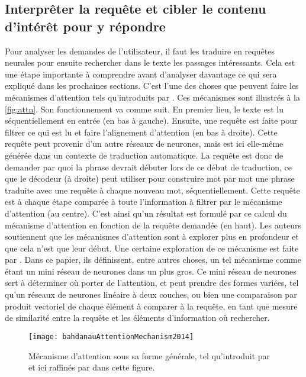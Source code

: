 \subsection{Interprêter la requête et cibler le contenu d'intérêt pour y répondre}

Pour analyser les demandes de l'utilisateur, il faut les traduire en requêtes neurales pour ensuite rechercher dans le texte les passages intéressants. Cela est une étape importante à comprendre avant d'analyser davantage ce qui sera expliqué dans les prochaines sections. C'est l'une des choses que peuvent faire les mécanismes d'attention tels qu'introduits par \cite{attentionMechanism}. Ces mécanismes sont illustrés à la \autoref{fig:attn}. Son fonctionnement va comme suit. En premier lieu, le texte est lu séquentiellement en entrée (en bas à gauche). Ensuite, une requête est faite pour filtrer ce qui est lu et faire l'alignement d'attention (en bas à droite). Cette requête peut provenir d'un autre réseaux de neurones, mais est ici elle-même générée dans un contexte de traduction automatique. La requête est donc de demander par quoi la phrase devrait débuter lors de ce début de traduction, ce que le décodeur (à droite) peut utiliser pour construire mot par mot une phrase traduite avec une requête à chaque nouveau mot, séquentiellement. Cette requête est à chaque étape comparée à toute l'information à filtrer par le mécanisme d'attention (au centre). C'est ainsi qu'un résultat est formulé par ce calcul du mécanisme d'attention en fonction de la requête demandée (en haut). Les auteurs soutiennent que les mécanismes d'attention sont à explorer plus en profondeur et que cela n'est que leur début. Une certaine exploration de ce mécanisme est faite par \cite{attentionBasedApproaches}. Dans ce papier, ils définissent, entre autres choses, un tel mécanisme comme étant un mini réseau de neurones dans un plus gros. Ce mini réseau de neurones sert à déterminer où porter de l'attention, et peut prendre des formes variées, tel qu'un réseaux de neurones linéaire à deux couches, ou bien une comparaison par produit vectoriel de chaque élément à comparer à la requête, en tant que mesure de similarité entre la requête et les éléments d'information où rechercher. \\

\begin{figure*}
  \centering
  \texttt{[image: bahdanauAttentionMechanism2014]}
  \caption{Mécanisme d'attention sous sa forme générale, tel qu'introduit par \cite{attentionMechanism} et ici raffinés par \cite{attentionBasedApproaches} dans cette figure.}
  \label{fig:attn}
\end{figure*}

